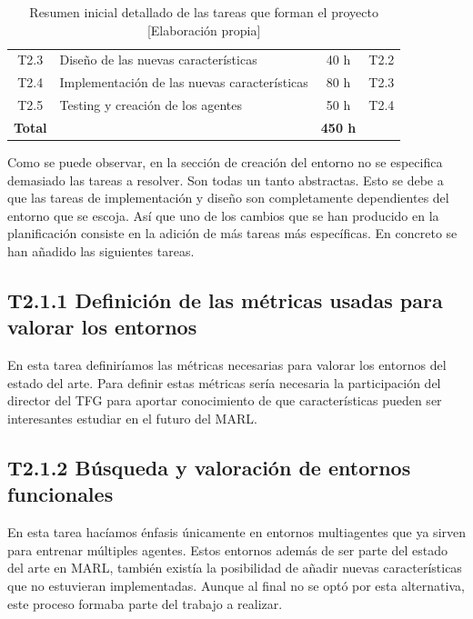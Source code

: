 \begin{table}[h]
\begin{center}
\begin{tabular}{| c | l | c | c |}
			T2.3            & Diseño de las nuevas características         & 40 h            & T2.2                 \\
			T2.4            & Implementación de las nuevas características & 80 h            & T2.3                 \\
			T2.5            & Testing y creación de los agentes            & 50 h            & T2.4                 \\
			\hline
			\textbf{Total}  &                                              & \textbf{450 h}  &                      \\
			\hline
		\end{tabular}
		\caption{Resumen inicial detallado de las tareas que forman el proyecto [Elaboración propia]}
		\label{tab:planificacion}
	\end{center}
\end{table}

Como se puede observar, en la sección de creación del entorno no se especifica demasiado las tareas a resolver. Son todas un tanto abstractas. Esto se debe a que las tareas de implementación y diseño son completamente dependientes del entorno que se escoja. Así que uno de los cambios que se han producido en la planificación consiste en la adición de más tareas más específicas. En concreto se han añadido las siguientes tareas.  

\subsection*{T2.1.1 Definición de las métricas usadas para valorar los entornos}
En esta tarea definiríamos las métricas necesarias para valorar los entornos del estado del arte. Para definir estas métricas sería necesaria la participación del director del TFG para aportar conocimiento de que características pueden ser interesantes estudiar en el futuro del MARL.

\subsection*{T2.1.2 Búsqueda y valoración de entornos funcionales}
En esta tarea hacíamos énfasis únicamente en entornos multiagentes que ya sirven para entrenar múltiples agentes. Estos entornos además de ser parte del estado del arte en MARL, también existía la posibilidad de añadir nuevas características que no estuvieran implementadas. Aunque al final no se optó por esta alternativa, este proceso formaba parte del trabajo a realizar.

